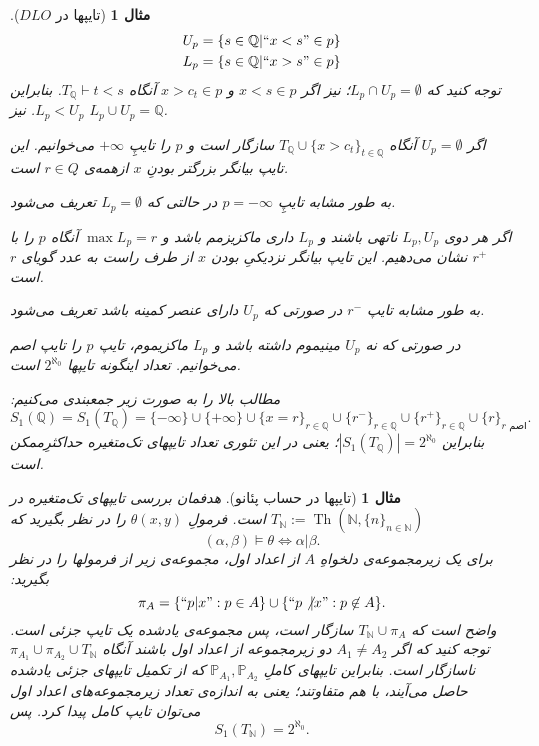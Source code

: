 \documentclass[12pt,a4paper]{article}
\theoremstyle{colorhead}
\newtheorem{mesal}[thm]{مثال}
\DeclareMathOperator{\Th}{Th}
\begin{document}
\begin{mesal}[تایپها در
$DLO$]
\begin{align*}
& U_p=\{s\in \mathbb{Q}|``x<s"\in p\}
\\
& 
L_p=\{s\in \mathbb{Q}|``x>s"\in p\}
\end{align*}
توجه کنید که
$L_p\cap U_p=\emptyset$؛
نیز اگر
$x<s\in p$
و
$x>c_t\in p$
آنگاه
$T_\mathbb{Q}\vdash t<s$.
بنابراین
$L_p<U_p$.
نیز
$L_p\cup U_p=\mathbb{Q}$.
\par 
اگر
$U_p=\emptyset$
آنگاه 
$T_\mathbb{Q}\cup \{x>c_t\}_{t\in \mathbb{Q}}$
سازگار است و 
$p$
را تایپِ 
$+\infty$
می‌خوانیم. این تایپ بیانگر بزرگتر بودنِ
$x$
ازهمه‌ی 
$r\in Q$
است.
\par 
به طور مشابه تایپِ
$p=-\infty$
در حالتی که 
$L_p=\emptyset$
تعریف می‌شود.
\par 
اگر هر دوی
$L_p,U_p$
ناتهی باشند و 
$L_p$
داری ماکزیزمم باشد و 
$\max L_p=r$
آنگاه 
$p$
را
با
$r^+$
نشان می‌دهیم. این تایپ بیانگر نزدیکیِ بودن
$x$
از طرف راست
به عدد گویای 
$r$
است. 
\par 
به طور مشابه تایپ
$r^-$
در صورتی که
$U_p$
دارای عنصر کمینه باشد تعریف می‌شود. 
\par 
در صورتی که نه
$U_p$
مینیموم داشته باشد و 
$L_p$
ماکزیموم، تایپ
$p$
را تایپ اصم می‌خوانیم. تعداد اینگونه تایپها
$2^{\aleph_0}$
است. 
\par 
مطالب بالا را به صورت زیر جمعبندی می‌کنیم:
\[
S_1(\mathbb{Q})=S_1(T_\mathbb{Q})=\{-\infty\}\cup \{+\infty\}\cup
\{x=r\}_{r\in \mathbb{Q}}\cup \{r^-\}_{r\in \mathbb{Q}}\cup \{r^+\}_{r\in \mathbb{Q}}\cup \{r\}_{\text{$r$ اصم}}.
\]
بنابراین
$|S_1(T_\mathbb{Q})|=2^{\aleph_0}$؛
یعنی در این تئوری تعداد تایپهای تک‌متغیره حداکثرِ‌ممکن است. 
\end{mesal}
\begin{mesal}[تایپها در حساب پئانو]
هدفمان بررسی تایپهای تک‌متغیره در 
$T_\mathbb{N}:=\Th(\mathbb{N}, \{n\}_{n\in \mathbb{N}})$
است. 
فرمولِ
$\theta(x,y)$
را در نظر بگیرید که
\[
(\alpha,\beta)\models \theta \Leftrightarrow \alpha|\beta.
\]
برای یک زیرمجموعه‌ی دلخواهِ
$A$
از اعداد اول، مجموعه‌ی زیر از فرمولها را در نظر بگیرید:
\[
\pi_A=\{``p|x": p\in A\}\cup \{``p\not|x":p\not\in A\}.
\]
واضح است که 
$T_\mathbb{N}\cup \pi_A$
سازگار است، پس مجموعه‌ی یادشده یک تایپ جزئی است. توجه کنید که اگر
$A_1\not=A_2$
دو زیرمجموعه از اعداد اول باشند آنگاه
$\pi_{A_1}\cup\pi_{A_2}\cup T_\mathbb{N}$
ناسازگار است. بنابراین تایپهای کاملِ
$\mathbb{P}_{A_1},\mathbb{P}_{A_2}$
که از تکمیل تایپهای جزئی یادشده حاصل می‌آیند، با هم متفاوتند؛ یعنی به اندازه‌ی تعداد زیرمجموعه‌های اعداد اول می‌توان تایپ کامل پیدا کرد. پس
\[
S_1(T_\mathbb{N})=2^{\aleph_0}.
\]
\end{mesal}
\end{document}
